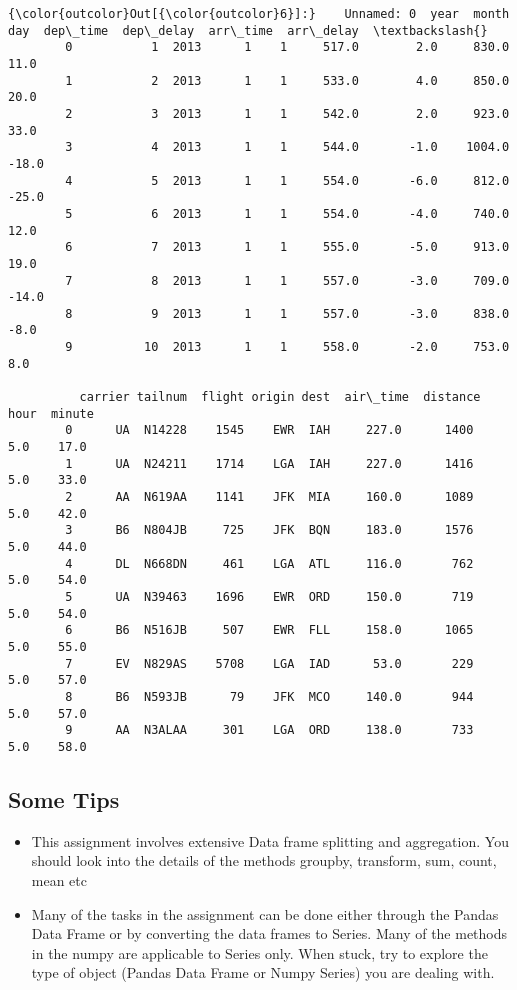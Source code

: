 \documentclass[11pt]{article}
\providecommand{\tightlist}{%
      \setlength{\itemsep}{0pt}\setlength{\parskip}{0pt}}
\begin{document}
\begin{Verbatim}[commandchars=\\\{\}]
{\color{outcolor}Out[{\color{outcolor}6}]:}    Unnamed: 0  year  month  day  dep\_time  dep\_delay  arr\_time  arr\_delay  \textbackslash{}
        0           1  2013      1    1     517.0        2.0     830.0       11.0   
        1           2  2013      1    1     533.0        4.0     850.0       20.0   
        2           3  2013      1    1     542.0        2.0     923.0       33.0   
        3           4  2013      1    1     544.0       -1.0    1004.0      -18.0   
        4           5  2013      1    1     554.0       -6.0     812.0      -25.0   
        5           6  2013      1    1     554.0       -4.0     740.0       12.0   
        6           7  2013      1    1     555.0       -5.0     913.0       19.0   
        7           8  2013      1    1     557.0       -3.0     709.0      -14.0   
        8           9  2013      1    1     557.0       -3.0     838.0       -8.0   
        9          10  2013      1    1     558.0       -2.0     753.0        8.0   
        
          carrier tailnum  flight origin dest  air\_time  distance  hour  minute  
        0      UA  N14228    1545    EWR  IAH     227.0      1400   5.0    17.0  
        1      UA  N24211    1714    LGA  IAH     227.0      1416   5.0    33.0  
        2      AA  N619AA    1141    JFK  MIA     160.0      1089   5.0    42.0  
        3      B6  N804JB     725    JFK  BQN     183.0      1576   5.0    44.0  
        4      DL  N668DN     461    LGA  ATL     116.0       762   5.0    54.0  
        5      UA  N39463    1696    EWR  ORD     150.0       719   5.0    54.0  
        6      B6  N516JB     507    EWR  FLL     158.0      1065   5.0    55.0  
        7      EV  N829AS    5708    LGA  IAD      53.0       229   5.0    57.0  
        8      B6  N593JB      79    JFK  MCO     140.0       944   5.0    57.0  
        9      AA  N3ALAA     301    LGA  ORD     138.0       733   5.0    58.0  
\end{Verbatim}
            
    \subsection{Some Tips}\label{some-tips}

\begin{itemize}
\tightlist
\item
  This assignment involves extensive Data frame splitting and
  aggregation. You should look into the details of the methods groupby,
  transform, sum, count, mean etc
\item
  Many of the tasks in the assignment can be done either through the
  Pandas Data Frame or by converting the data frames to Series. Many of
  the methods in the numpy are applicable to Series only. When stuck,
  try to explore the type of object (Pandas Data Frame or Numpy Series)
  you are dealing with.
\end{itemize}
\end{document}
